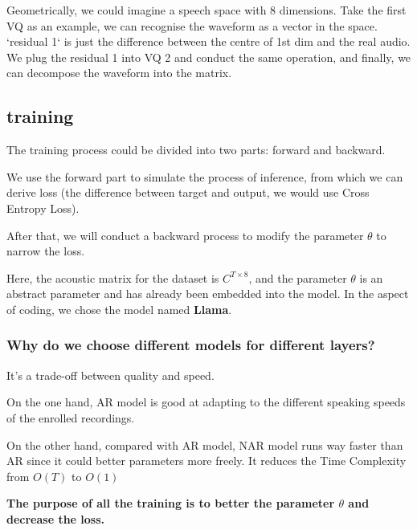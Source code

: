 \documentclass{article}
\begin{document}
Geometrically, we could imagine a speech space with 8 dimensions. Take the first VQ as an example, we can recognise the waveform as a vector in the space. `residual 1` is just the difference between the centre of 1st dim and the real audio. We plug the residual 1 into VQ 2 and conduct the same operation, and finally, we can decompose the waveform into the matrix. 
\subsection{training}

The training process could be divided into two parts: forward and backward. 

We use the forward part to simulate the process of inference, from which we can derive loss (the difference between target and output, we would use Cross Entropy Loss). 

After that, we will conduct a backward process to modify the parameter $\theta$ to narrow the loss. 

Here, the acoustic matrix for the dataset is $C^{T\times 8}$, and the parameter $\theta$ is an abstract parameter and has already been embedded into the model. In the aspect of coding, we chose the model named \textbf{Llama}. 

\subsubsection{Why do we choose different models for different layers? }
It's a trade-off between quality and speed. 

On the one hand, AR model is good at adapting to the different speaking speeds of the enrolled recordings. 

On the other hand, compared with AR model, NAR model runs way faster than AR since it could better parameters more freely. It reduces the Time Complexity from $O(T)$ to $O(1)$


\vspace{5pt}
\textbf{The purpose of all the training is to better the parameter $\theta$ and decrease the loss. } 
\end{document}
